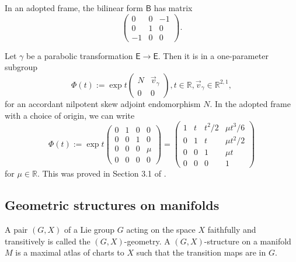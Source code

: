 \documentclass{amsart}
\numberwithin{equation}{section}
\newcommand\bR{{\mathbb{R}}}
\newcommand\ra{\rightarrow}
\newcommand\Lspace{\mathsf E}
\newcommand\Bs{{\mathsf{B}}}
\theoremstyle{definition}
\theoremstyle{remark}
\begin{document}
In an adopted frame, 
the bilinear form $\Bs$ has matrix
\begin{equation}\label{eqn:Bform}  
	\left(
	\begin{array}{ccc}
		0 & 0 & -1 \\
		0 & 1 & 0 \\
		-1 & 0 & 0
	\end{array}
	\right).
\end{equation}


Let $\gamma$ be a parabolic transformation $\Lspace \ra \Lspace$.
Then it is in a one-parameter subgroup 
	\begin{equation}\label{eqn:Phit0}
		\Phi(t) := \exp t
		\left(
		\begin{array}{cc}
			N & \vec{v}_\gamma \\
			0 & 0 
		\end{array}
		\right), t\in \bR, \vec{v}_\gamma \in \bR^{2, 1},
\end{equation} 
for an accordant nilpotent skew adjoint endomorphism $N$. 
In the adopted frame with a choice of origin, we
can write 
\begin{equation}\label{eqn:Phit}
	\Phi(t) := \exp t
	\left(
	\begin{array}{cccc}
		0  & 1  & 0  &0\\
		0  & 0  & 1  & 0\\
		0  & 0  &  0 & \mu \\
		0 &  0 & 0 & 0 
	\end{array}
	\right)
	= 
	\left(
	\begin{array}{cccc}
		1 & t  & t^{2}/2 & \mu t^{3}/6  \\
		0   & 1  & t  & \mu t^{2}/2  \\
		0  &  0  & 1 & \mu t \\ 
		0 & 0 & 0 & 1   
	\end{array}
	\right)
\end{equation} 
for $\mu \in \bR$. 
This was proved in Section 3.1 of \cite{CDG22}. 

\subsection{Geometric structures on manifolds} \label{sub:geostr}

A pair $(G, X)$ of a Lie group $G$ acting on the space $X$ faithfully and 
transitively is called the $(G, X)$-geometry. 
A $(G, X)$-structure on a manifold $M$ is a maximal atlas of charts to $X$ 
such that 
the transition maps are in $G$. 
\end{document}
